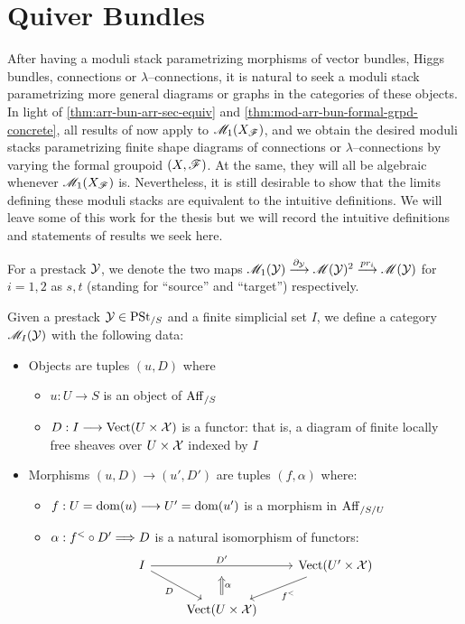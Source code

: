 \documentclass[11pt]{amsart}
\begin{document}

\section{Quiver Bundles}\label{sec:QuivBun}

After having a moduli stack parametrizing morphisms of vector bundles, Higgs
bundles, connections or $\lambda$--connections, it is natural to seek a moduli
stack parametrizing more general diagrams or graphs in the categories of these
objects. In light of \cref{thm:arr-bun-arr-sec-equiv} and
\cref{thm:mod-arr-bun-formal-grpd-concrete}, all results of
\cite[\S 3, \S 4]{ModQuivBun} now apply to $\mathscr{M}_1(X_\mathscr{F})$,
and we obtain the desired moduli stacks parametrizing finite shape diagrams
of connections or $\lambda$--connections by varying the formal groupoid
$(X, \mathscr{F})$. At the same, they will all be algebraic whenever
$\mathscr{M}_1(X_\mathscr{F})$ is.
Nevertheless, it is still desirable to show that the limits defining
these moduli stacks are equivalent to the intuitive definitions.
We will leave some of this work for the thesis but we will record the intuitive
definitions and statements of results we seek here.

\begin{notn}
For a prestack $\mathcal{Y}$, we denote the two maps
$\sM_1(\mcY) \to[\partial_\mcY] \sM(\mcY)^2 \to[pr_i] \sM(\mcY)$
for $i = 1, 2$ as $s, t$ (standing for ``source'' and ``target'')
respectively.
\end{notn}

\begin{cns}
Given a prestack $\mathcal{Y} \in \mathrm{PSt}_{/S}$ and a finite simplicial set $I$,
we define a category $\mathscr{M}_I(\mathcal{Y})$ with the following data:
\begin{itemize}
\item Objects are tuples $(u, D)$ where
  \begin{itemize}
  \item $u : U \to S$ is an object of $\mathrm{Aff}_{/S}$
  \item $D : I \to \Vect(U \times \mcX)$ is a functor: that is, a diagram of
    finite locally free sheaves over $U \times \mathcal{X}$ indexed by $I$
  \end{itemize}
\item Morphisms $(u, D) \to (u', D')$ are tuples $(f, \alpha)$ where:
  \begin{itemize}
  \item $f : U = \dom(u) \to U' = \dom(u')$ is a morphism in $\mathrm{Aff}_{/S/U}$
  \item $\alpha : f^< \circ D' \To D$ is a natural isomorphism of functors:
  \[\begin{tikzcd}
  I \ar[rr, "D'", ""{below, name=U}] \ar[rd, "D" below left] & &
  \Vect(U' \times \mcX) \ar[ld, "f^<" below right] \\
  & \Vect(U \times \mcX) \ar[from=U, Leftarrow, "\alpha", shorten=0.35em] &
  \end{tikzcd}\]
  \end{itemize}
\end{itemize}
\end{cns}
\end{document}
